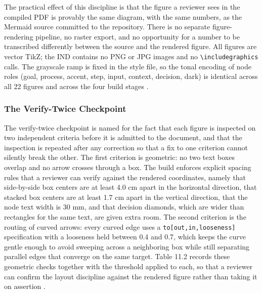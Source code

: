 The practical effect of this discipline is that the figure a reviewer sees in the
compiled PDF is provably the same diagram, with the same numbers, as the Mermaid
source committed to the repository. There is no separate figure-rendering pipeline,
no raster export, and no opportunity for a number to be transcribed differently
between the source and the rendered figure. All figures are vector TikZ; the IND
contains no PNG or JPG images and no \texttt{\textbackslash includegraphics} calls.
The grayscale ramp is fixed in the style file, so the tonal encoding of node roles
(goal, process, accent, step, input, context, decision, dark) is identical across
all 22 figures and across the four build stages \cite{fdadigtwinpc}.

\subsubsection{The Verify-Twice Checkpoint}

The verify-twice checkpoint is named for the fact that each figure is inspected on
two independent criteria before it is admitted to the document, and that the
inspection is repeated after any correction so that a fix to one criterion cannot
silently break the other. The first criterion is geometric: no two text boxes
overlap and no arrow crosses through a box. The build enforces explicit spacing
rules that a reviewer can verify against the rendered coordinates, namely that
side-by-side box centers are at least 4.0 cm apart in the horizontal direction,
that stacked box centers are at least 1.7 cm apart in the vertical direction, that
the node text width is 30 mm, and that decision diamonds, which are wider than
rectangles for the same text, are given extra room. The second criterion is the
routing of curved arrows: every curved edge uses a \texttt{to[out,in,looseness]}
specification with a looseness held between 0.4 and 0.7, which keeps the curve
gentle enough to avoid sweeping across a neighboring box while still separating
parallel edges that converge on the same target. Table 11.2 records these geometric
checks together with the threshold applied to each, so that a reviewer can confirm
the layout discipline against the rendered figure rather than taking it on
assertion \cite{fdadigtwinpc, natlpaiplatf}.

